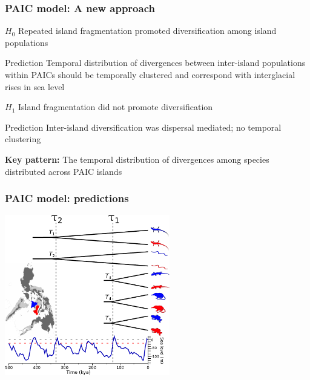 \begin{frame}
    \frametitle{PAIC model: A new approach}
            \begin{mydescription}
                \item[$H_0$] Repeated island fragmentation promoted diversification
                    among island populations
                    \begin{mydescription}
                        \item[Prediction] Temporal distribution of divergences
                            between inter-island populations within PAICs
                            should be temporally clustered and correspond with
                            interglacial rises in sea level
                    \end{mydescription}
                \item[$H_1$] Island fragmentation did not promote diversification
                    \begin{mydescription}
                        \item[Prediction] Inter-island diversification was
                            dispersal mediated; no temporal clustering
                    \end{mydescription}
            \end{mydescription}
            
            {\bf Key pattern:} The temporal distribution of divergences
                    among species distributed across PAIC islands
\end{frame}

\begin{frame}
    \frametitle{PAIC model: predictions}
    \includegraphics[height=7cm]{images/sea-level-prediction-trees-labels.pdf}
\end{frame}



